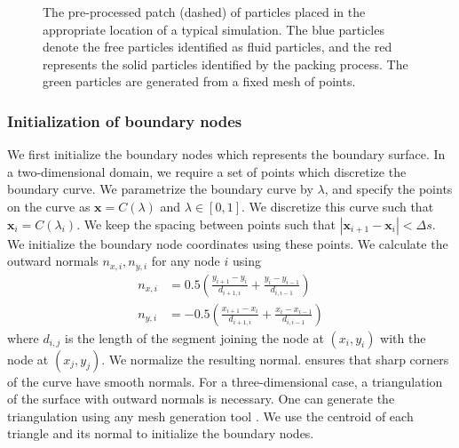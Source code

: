 \documentclass[preprint,12pt]{elsarticle}
\newcommand{\ten}[1]{\ensuremath{\mathbf{#1}}}
\begin{document}
\begin{figure}[ht!]
{
  }
	\caption{The pre-processed patch (dashed) of particles placed in the
    appropriate location of a typical simulation. The blue particles denote
    the free particles identified as fluid particles, and the red represents the
    solid particles identified by the packing process. The green particles are
    generated from a fixed mesh of points.}
	\label{fig:sim}
\end{figure}

\subsubsection{Initialization of boundary nodes}
\label{subsec:geom}

We first initialize the boundary nodes which represents the boundary surface.
In a two-dimensional domain, we require a set of points which discretize the
boundary curve. We parametrize the boundary curve by $\lambda$, and specify
the points on the curve as $\ten{x} = C(\lambda)$ and $ \lambda \in [0, 1]$.
We discretize this curve such that $\ten{x}_i = C(\lambda_i)$. We keep the
spacing between points such that $|\ten{x}_{i+1} - \ten{x}_i| < \Delta s$.
We initialize the boundary node coordinates using these points. We calculate
the outward normals $n_{x, i},n_{y, i}$ for any node $i$ using
\begin{equation}
  \begin{split}
  n_{x,i}  & =0.5  \left ( \frac{y_{i+1} - y_{i}}{d_{i+1, i}} +
   \frac{y_{i} - y_{i-1}}{d_{i, i-1}} \right) \\
  n_{y,i}  & =-0.5 \left( \frac{x_{i+1} - x_{i}}{d_{i+1, i}} +
  \frac{x_{i} - x_{i-1}}{d_{i, i-1}} \right)
  \end{split}
  \label{eq:2dnormal}
\end{equation}
where $d_{i, j}$ is the length of the segment joining the node at $(x_i, y_i)$
with the node at $(x_j, y_j)$. We normalize the resulting normal.
 ensures that sharp corners of the curve have smooth
normals. For a three-dimensional case, a triangulation of the surface with
outward normals is necessary. One can generate the triangulation using any
mesh generation tool \cite{bern1992mesh}. We use the centroid of each triangle
and its normal to initialize the boundary nodes.
\end{document}
